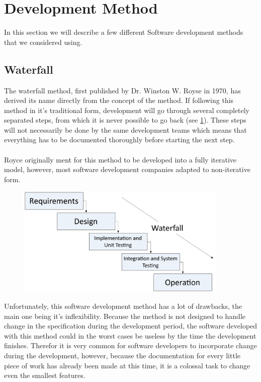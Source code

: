 \section{Development Method}
\label{sec:DevelopmentMethods}
In this section we will describe a few different Software development methods that we considered using.

\subsection{Waterfall}
The waterfall method, first published by Dr. Winston W. Royse in 1970, has derived its name directly from the concept of the method. If following this method in it's traditional form, development will go through several completely separated steps, from which it is never possible to go back (see \ref{fig:WaterfallPic}). These steps will not necessarily be done by the same development teams which means that everything has to be documented thoroughly before starting the next step.\\
 \\
Royce originally ment for this method to be developed into a fully iterative model, however, most software development companies adapted to non-iterative form.
\cite{waterfallroyce}

\begin{figure}[H]
	\centering
		\includegraphics[width=0.90\textwidth]{input/implementation/development/waterfall.pdf}
	\label{fig:WaterfallPic}
\end{figure}

Unfortunately, this software development method has a lot of drawbacks, the main one being it's inflexibility. Because the method is not designed to handle change in the specification during the development period, the software developed with this method could in the worst cases be useless by the time the development finishes. Therefor it is very common for software developers to incorporate change during the development, however, because the documentation for every little piece of work has already been made at this time, it is a colossal task to change even the smallest features. 

